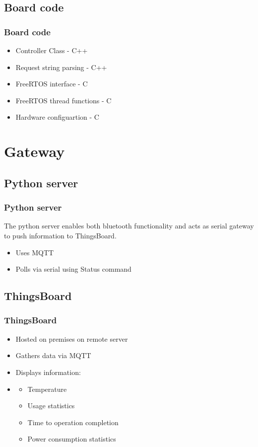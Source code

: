 \documentclass[12pt]{beamer}
\begin{document}
\subsection{Board code}
\begin{frame}
    \frametitle{Board code}

    \begin{itemize}
        \item Controller Class - C++
        \item Request string parsing - C++
        \item FreeRTOS interface - C
        \item FreeRTOS thread functions - C
        \item Hardware configuartion - C
    \end{itemize}
\end{frame}

\section{Gateway}
\subsection{Python server}

\begin{frame}
    \frametitle{Python server}

The python server enables both bluetooth functionality and acts as serial gateway to push information to ThingsBoard.
\begin{itemize}
    \item Uses MQTT
    \item Polls via serial using Status command
\end{itemize}

\end{frame}


\subsection{ThingsBoard}
\begin{frame}
    \frametitle{ThingsBoard}
    \begin{itemize}
        \item Hosted on premises on remote server
        \item Gathers data via MQTT
        \item Displays information:
        \item    \begin{itemize}
                \item Temperature
                \item Usage statistics
                \item Time to operation completion
                \item Power consumption statistics
            \end{itemize}

   \end{itemize}
\end{frame}
\end{document}
